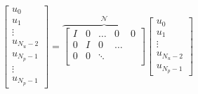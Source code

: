 \documentclass[a4paper,12pt,fleqn]{book}
\newcommand{\Np}{{N_p}}
\newcommand{\Nu}{{N_u}}
\begin{document}
\begin{equation}
\begin{bmatrix}
u_0\\
u_1\\
\vdots\\
u_{\Nu-2}\\
u_{\Np-1}\\
\vdots\\
u_{\Np-1}
\end{bmatrix} =
\overbrace{
\begin{bmatrix}
I & 0 & \dots & 0 & 0 \\
0 & I & 0 & \dots\\
0 & 0 & \ddots \\
\end{bmatrix}
}^{\mathcal{N}}
\begin{bmatrix}
u_0\\
u_1\\
\vdots\\
u_{\Nu-2}\\
u_{\Np-1}
\end{bmatrix}  
\end{equation}
\end{document}
